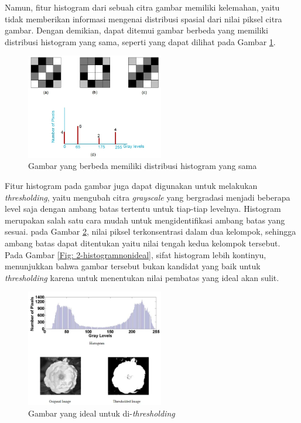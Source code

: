 \noindent Namun, fitur histogram dari sebuah citra gambar memiliki kelemahan, yaitu tidak memberikan informasi mengenai distribusi spasial dari nilai piksel citra gambar. Dengan demikian, dapat ditemui gambar berbeda yang memiliki distribusi histogram yang sama, seperti yang dapat dilihat pada Gambar \ref{Fig: 2-histogramdrawback}.

\begin{figure}[!ht]
	\centering
	\includegraphics[width=6cm]{contents/chapter-2/2-histogramdrawback.png}
	\caption[Gambar yang berbeda memiliki distribusi histogram yang sama]{Gambar yang berbeda memiliki distribusi histogram yang sama \cite{fiturhistogram}}
	\label{Fig: 2-histogramdrawback}
\end{figure}

Fitur histogram pada gambar juga dapat digunakan untuk melakukan \emph{thresholding}, yaitu mengubah citra \emph{grayscale} yang bergradasi menjadi beberapa
level saja dengan ambang batas tertentu untuk tiap-tiap levelnya. Histogram merupakan salah satu cara mudah untuk mengidentifikasi ambang batas yang sesuai.
pada Gambar \ref{Fig: 2-histogramideal}, nilai piksel terkonsentrasi dalam dua kelompok, sehingga ambang batas dapat ditentukan yaitu nilai tengah kedua
kelompok tersebut. Pada Gambar \ref{Fig: 2-histogramnonideal}, sifat histogram lebih kontinyu, menunjukkan bahwa gambar tersebut bukan kandidat yang baik untuk
\emph{thresholding} karena untuk menentukan nilai pembatas yang ideal akan sulit.

\begin{figure}[!ht]
	\centering
	\includegraphics[width=6cm]{contents/chapter-2/2-histogramideal.png}
	\caption[Gambar yang ideal untuk di-\emph{thresholding}]{Gambar yang ideal untuk di-\emph{thresholding} \cite{fiturhistogram}}
	\label{Fig: 2-histogramideal}
\end{figure}

